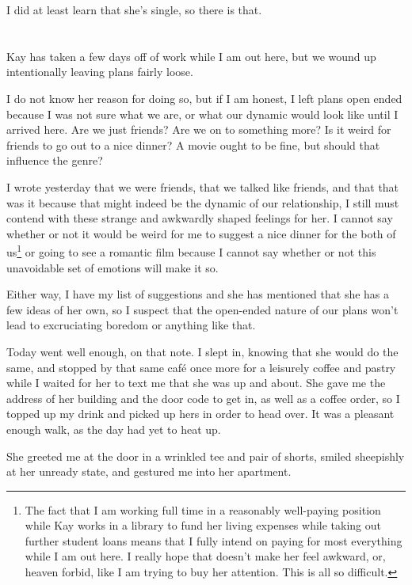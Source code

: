 I did at least learn that she's single, so there is that.

\section{}

Kay has taken a few days off of work while I am out here, but we wound up intentionally leaving plans fairly loose.

I do not know her reason for doing so, but if I am honest, I left plans open ended because I was not sure what we are, or what our dynamic would look like until I arrived here. Are we just friends? Are we on to something more? Is it weird for friends to go out to a nice dinner? A movie ought to be fine, but should that influence the genre?

I wrote yesterday that we were friends, that we talked like friends, and that that was it because that might indeed be the dynamic of our relationship, I still must contend with these strange and awkwardly shaped feelings for her. I cannot say whether or not it would be weird for me to suggest a nice dinner for the both of us\footnote{The fact that I am working full time in a reasonably well-paying position while Kay works in a library to fund her living expenses while taking out further student loans means that I fully intend on paying for most everything while I am out here. I really hope that doesn't make her feel awkward, or, heaven forbid, like I am trying to buy her attention. This is all so difficult.} or going to see a romantic film because I cannot say whether or not this unavoidable set of emotions will make it so.

Either way, I have my list of suggestions and she has mentioned that she has a few ideas of her own, so I suspect that the open-ended nature of our plans won't lead to excruciating boredom or anything like that.

Today went well enough, on that note. I slept in, knowing that she would do the same, and stopped by that same café once more for a leisurely coffee and pastry while I waited for her to text me that she was up and about. She gave me the address of her building and the door code to get in, as well as a coffee order, so I topped up my drink and picked up hers in order to head over. It was a pleasant enough walk, as the day had yet to heat up.

She greeted me at the door in a wrinkled tee and pair of shorts, smiled sheepishly at her unready state, and gestured me into her apartment.

